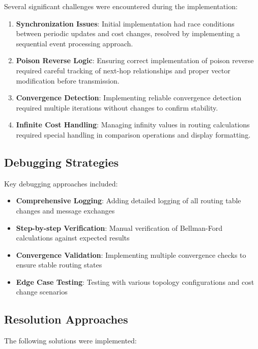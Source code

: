 \documentclass[12pt,a4paper]{article}
\begin{document}
Several significant challenges were encountered during the implementation:

\begin{enumerate}
\item \textbf{Synchronization Issues}: Initial implementation had race conditions between periodic updates and cost changes, resolved by implementing a sequential event processing approach.

\item \textbf{Poison Reverse Logic}: Ensuring correct implementation of poison reverse required careful tracking of next-hop relationships and proper vector modification before transmission.

\item \textbf{Convergence Detection}: Implementing reliable convergence detection required multiple iterations without changes to confirm stability.

\item \textbf{Infinite Cost Handling}: Managing infinity values in routing calculations required special handling in comparison operations and display formatting.
\end{enumerate}

\subsection{Debugging Strategies}

Key debugging approaches included:

\begin{itemize}
\item \textbf{Comprehensive Logging}: Adding detailed logging of all routing table changes and message exchanges
\item \textbf{Step-by-step Verification}: Manual verification of Bellman-Ford calculations against expected results
\item \textbf{Convergence Validation}: Implementing multiple convergence checks to ensure stable routing states
\item \textbf{Edge Case Testing}: Testing with various topology configurations and cost change scenarios
\end{itemize}

\subsection{Resolution Approaches}

The following solutions were implemented:
\end{document}
